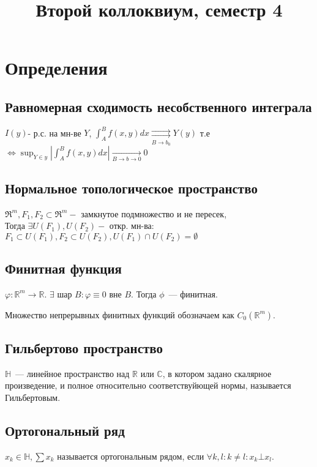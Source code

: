 \documentclass[paper=a4, fontsize=14pt]{report}
\author{}
\title{Второй коллоквиум, семестр 4}
\begin{document}
\maketitle
\tableofcontents
\newpage

\chapter{Определения}
    \section{Равномерная сходимость несобственного интеграла}
    $I(y)$- р.с. на мн-ве $Y$, $\int_A^B f(x,y) dx \underset{B \to b_0}{\rightrightarrows}  Y(y)$ т.е \newline $\Leftrightarrow \sup_{Y \in y} |\int_A^B f(x,y) dx| \underset{B \rightarrow b \to 0}{\rightarrow} 0$

    \section{Нормальное топологическое пространство}
    $\Re^m, F_1,F_2 \subset \Re^m -$ замкнутое подмножество и не пересек, \\
    Тогда  $\exists U(F_1), U(F_2) -$ откр. мн-ва: $F_1 \subset U(F_1), F_2 \subset U(F_2), U(F_1) \cap U(F_2) = \emptyset$

    \section{Финитная функция}
    $\varphi : \mathbb{R}^m \rightarrow \mathbb{R}$. $\exists$ шар $B: \varphi \equiv 0 $ вне $B$. Тогда $\phi$~--- финитная.

    Множество непрерывных финитных функций обозначаем как $C_0(\mathbb{R}^m)$.

	\section{Гильбертово пространство}
	$\mathds{H}$~--- линейное пространство над $\mathds{R}$ или $\mathds{C}$, в котором задано скалярное произведение, и полное относительно соответствуйющей нормы, называется Гильбертовым.

	\section{Ортогональный ряд}
	$x_k \in \mathds{H}, \sum x_k$ называется ортогональным рядом, если $\forall k, l: k \neq l: x_k \bot x_l$.
\end{document}
